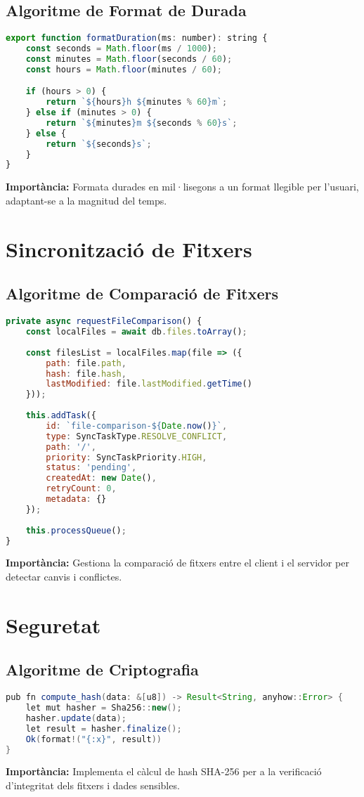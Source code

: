 \subsection{Algoritme de Format de Durada}
\begin{lstlisting}[language=JavaScript]
export function formatDuration(ms: number): string {
    const seconds = Math.floor(ms / 1000);
    const minutes = Math.floor(seconds / 60);
    const hours = Math.floor(minutes / 60);

    if (hours > 0) {
        return `${hours}h ${minutes % 60}m`;
    } else if (minutes > 0) {
        return `${minutes}m ${seconds % 60}s`;
    } else {
        return `${seconds}s`;
    }
}
\end{lstlisting}
\textbf{Importància:} Formata durades en mil·lisegons a un format llegible per l'usuari, adaptant-se a la magnitud del temps.

\section{Sincronització de Fitxers}

\subsection{Algoritme de Comparació de Fitxers}
\begin{lstlisting}[language=JavaScript]
private async requestFileComparison() {
    const localFiles = await db.files.toArray();
    
    const filesList = localFiles.map(file => ({
        path: file.path,
        hash: file.hash,
        lastModified: file.lastModified.getTime()
    }));
    
    this.addTask({
        id: `file-comparison-${Date.now()}`,
        type: SyncTaskType.RESOLVE_CONFLICT,
        path: '/',
        priority: SyncTaskPriority.HIGH,
        status: 'pending',
        createdAt: new Date(),
        retryCount: 0,
        metadata: {}
    });
    
    this.processQueue();
}
\end{lstlisting}
\textbf{Importància:} Gestiona la comparació de fitxers entre el client i el servidor per detectar canvis i conflictes.

\section{Seguretat}

\subsection{Algoritme de Criptografia}
\begin{lstlisting}[language=Java]
pub fn compute_hash(data: &[u8]) -> Result<String, anyhow::Error> {
    let mut hasher = Sha256::new();
    hasher.update(data);
    let result = hasher.finalize();
    Ok(format!("{:x}", result))
}
\end{lstlisting}
\textbf{Importància:} Implementa el càlcul de hash SHA-256 per a la verificació d'integritat dels fitxers i dades sensibles.

